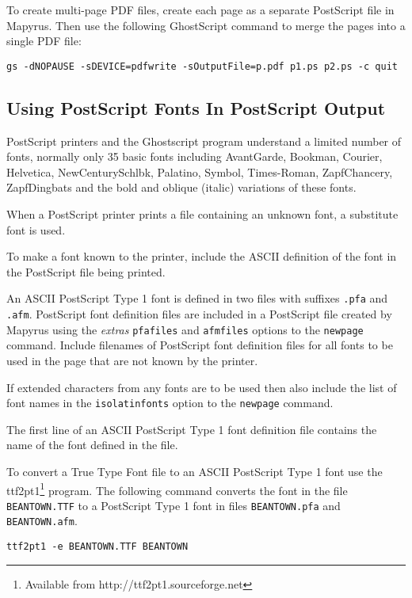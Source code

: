 To create multi-page PDF files, create each page as a separate
PostScript file in Mapyrus.  Then use the following GhostScript command to
merge the pages into a single PDF file:

\begin{verbatim}
gs -dNOPAUSE -sDEVICE=pdfwrite -sOutputFile=p.pdf p1.ps p2.ps -c quit
\end{verbatim}

\subsection{Using PostScript Fonts In PostScript Output}
\label{psfonts}

PostScript printers and the Ghostscript program
understand a limited number of fonts,
normally only 35 basic fonts including
AvantGarde,
Bookman,
Courier,
Helvetica,
NewCenturySchlbk,
Palatino,
Symbol,
Times-Roman,
ZapfChancery,
ZapfDingbats
and the bold
and oblique (italic) variations of these fonts.

When a PostScript printer prints a file containing an unknown font,
a substitute font is used.

To make a font known to the printer, include the ASCII definition of
the font in the PostScript file being printed.

An ASCII PostScript Type 1 font is defined in two files with suffixes
\texttt{.pfa} and \texttt{.afm}.  PostScript
font definition files are included in a PostScript file created
by Mapyrus using the
\textit{extras} \texttt{pfafiles} and \texttt{afmfiles}
options to the \texttt{newpage} command.
Include filenames of PostScript font definition files for all fonts to be used
in the page that are not known by the printer.

If extended characters from any fonts are to be used then also
include the list of font names in the \texttt{isolatinfonts} option
to the \texttt{newpage} command.

The first line of an ASCII PostScript Type 1 font definition file
contains the name of the font defined in the file.

To convert a True Type Font file to an ASCII PostScript Type 1 font use the
ttf2pt1\footnote{Available from http://ttf2pt1.sourceforge.net} program.  The
following command converts the font in the file \texttt{BEANTOWN.TTF} to a
PostScript Type 1 font in files
\texttt{BEANTOWN.pfa} and
\texttt{BEANTOWN.afm}.

\begin{verbatim}
ttf2pt1 -e BEANTOWN.TTF BEANTOWN
\end{verbatim}

